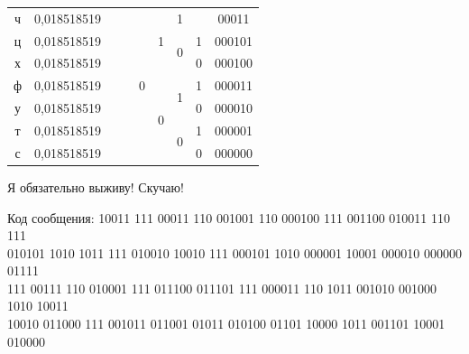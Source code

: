 \documentclass[a4paper,14pt]{extarticle}
\begin{document}
\begin{center}
\begin{tabular}{|c|c|c|c|c|c|c|c|c|}
        \cline{1-2} \cline{5-9}
        ч                       & 0,018518519                  &                             &                      & \multirow{7}{*}{0} & \multirow{3}{*}{1} & 1                  &    & 00011  \\
        \cline{1-2} \cline{7-9}
        ц                       & 0,018518519                  &                             &                      &                    &                    & \multirow{2}{*}{0} & 1  & 000101 \\
        \cline{1-2} \cline{8-9}
        х                       & 0,018518519                  &                             &                      &                    &                    &                    & 0  & 000100 \\
        \cline{1-2} \cline{6-9}
        ф                       & 0,018518519                  &                             &                      &                    & \multirow{4}{*}{0} & \multirow{2}{*}{1} & 1  & 000011 \\
        \cline{1-2} \cline{8-9}
        у                       & 0,018518519                  &                             &                      &                    &                    &                    & 0  & 000010 \\
        \cline{1-2} \cline{7-9}
        т                       & 0,018518519                  &                             &                      &                    &                    & \multirow{2}{*}{0} & 1  & 000001 \\
        \cline{1-2} \cline{8-9}
        с                       & 0,018518519                  &                             &                      &                    &                    &                    & 0  & 000000 \\
        \hline
    \end{tabular}
\end{center}

    Я обязательно выживу!
    Скучаю!
\fi

Код сообщения: 10011 111 00011 110 001001 110 000100 111 001100 010011 110 111 \\
010101 1010 1011 111 010010 10010 111 000101 1010 000001 10001 000010 000000 01111\\
111 00111 110 010001 111 011100 011101 111 000011 110 1011 001010 001000 1010 10011\\
10010 011000 111 001011 011001 01011 010100 01101 10000 1011 001101 10001 010000
\end{document}
